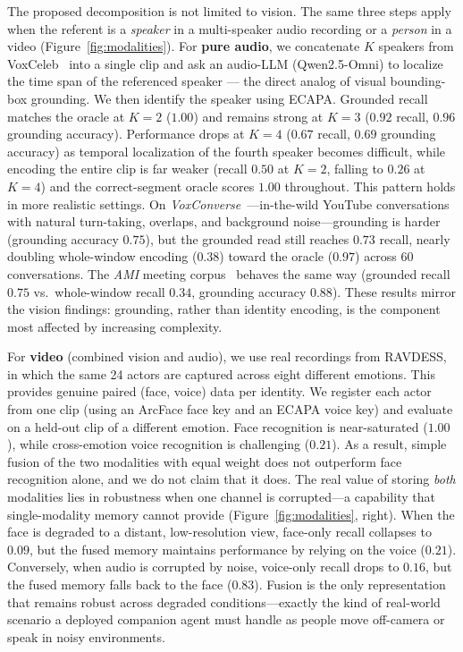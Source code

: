The proposed decomposition is not limited to vision. The same three steps apply when the referent is a \emph{speaker} in a multi-speaker audio recording or a \emph{person} in a video (Figure~\ref{fig:modalities}). For \textbf{pure audio}, we concatenate $K$ speakers from VoxCeleb~\citep{voxceleb} into a single clip and ask an audio-LLM (Qwen2.5-Omni) to localize the time span of the referenced speaker --- the direct analog of visual bounding-box grounding. We then identify the speaker using ECAPA. Grounded recall matches the oracle at $K{=}2$ ($1.00$) and remains strong at $K{=}3$ ($0.92$ recall, $0.96$ grounding accuracy). Performance drops at $K{=}4$ ($0.67$ recall, $0.69$ grounding accuracy) as temporal localization of the fourth speaker becomes difficult, while encoding the entire clip is far weaker (recall $0.50$ at $K{=}2$, falling to $0.26$ at $K{=}4$) and the correct-segment oracle scores $1.00$ throughout. This pattern holds in more realistic settings. On \emph{VoxConverse}~\citep{voxconverse}---in-the-wild YouTube conversations with natural turn-taking, overlaps, and background noise---grounding is harder (grounding accuracy $0.75$), but the grounded read still reaches $0.73$ recall, nearly doubling whole-window encoding ($0.38$) toward the oracle ($0.97$) across 60 conversations. The \emph{AMI} meeting corpus~\citep{ami} behaves the same way (grounded recall $0.75$ vs.\ whole-window recall $0.34$, grounding accuracy $0.88$). These results mirror the vision findings: grounding, rather than identity encoding, is the component most affected by increasing complexity.

For \textbf{video} (combined vision and audio), we use real recordings from RAVDESS, in which the same 24 actors are captured across eight different emotions. This provides genuine paired (face, voice) data per identity. We register each actor from one clip (using an ArcFace face key and an ECAPA voice key) and evaluate on a held-out clip of a different emotion. Face recognition is near-saturated ($1.00$), while cross-emotion voice recognition is challenging ($0.21$). As a result, simple fusion of the two modalities with equal weight does not outperform face recognition alone, and we do not claim that it does. The real value of storing \emph{both} modalities lies in robustness when one channel is corrupted---a capability that single-modality memory cannot provide (Figure~\ref{fig:modalities}, right). When the face is degraded to a distant, low-resolution view, face-only recall collapses to $0.09$, but the fused memory maintains performance by relying on the voice ($0.21$). Conversely, when audio is corrupted by noise, voice-only recall drops to $0.16$, but the fused memory falls back to the face ($0.83$). Fusion is the only representation that remains robust across degraded conditions---exactly the kind of real-world scenario a deployed companion agent must handle as people move off-camera or speak in noisy environments.

